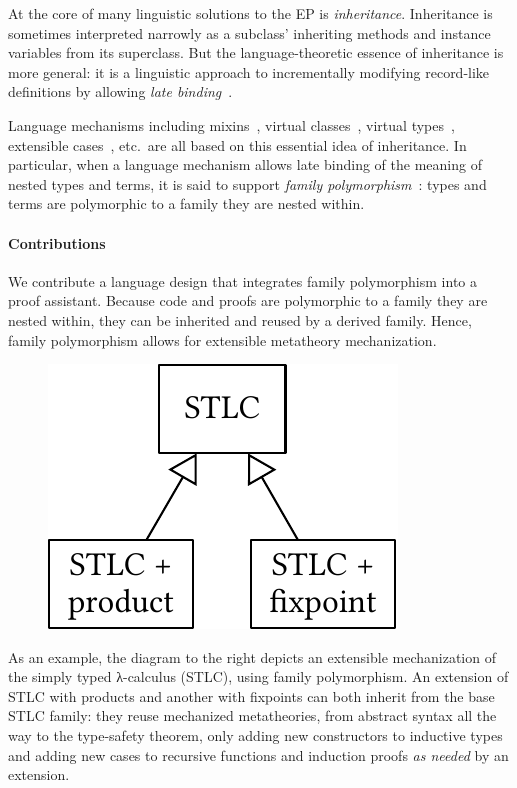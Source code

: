 At the core of many linguistic solutions to the EP is \emph{inheritance}.
Inheritance is sometimes interpreted narrowly as a subclass'
inheriting methods and instance variables from its superclass.
But the language-theoretic essence of inheritance is more general:
it is a linguistic approach to incrementally modifying
record-like definitions by allowing \emph{late binding}~\cite{cook1990inheritance}.

Language mechanisms including
mixins~\cite{mixin-1990},
virtual classes~\cite{virtualclasses-1989,vc-calculus-2006},
virtual types~\cite{thorup97}, %
extensible cases~\cite{bac2006}, etc.\ 
are all based on this essential idea of inheritance.
%
In particular, when a language mechanism allows late binding of the
meaning of nested types and terms,
it is said to support \emph{family polymorphism}~\cite{ernst2001family}:
types and terms are polymorphic to a family they are nested within.

\paragraph{Contributions}

We contribute a language design that integrates family polymorphism into
a proof assistant.
Because code and proofs are polymorphic to a family they are nested
within, they can be
inherited and reused by a derived family.
Hence, family polymorphism allows for extensible metatheory mechanization.

\begingroup

\begin{figure}
\includegraphics[scale=.48]{graphics/stlc-intro.pdf}
\end{figure}

As an example, the diagram to the right depicts an extensible
mechanization of the simply typed λ-calculus (STLC), using family
polymorphism.
An extension of STLC with products and another with fixpoints
can both inherit from the base STLC family:
they reuse mechanized metatheories,
from abstract syntax all the way to the type-safety theorem,
only adding new constructors to inductive types
and adding new cases to recursive functions and induction proofs
\emph{as needed} by an extension.

